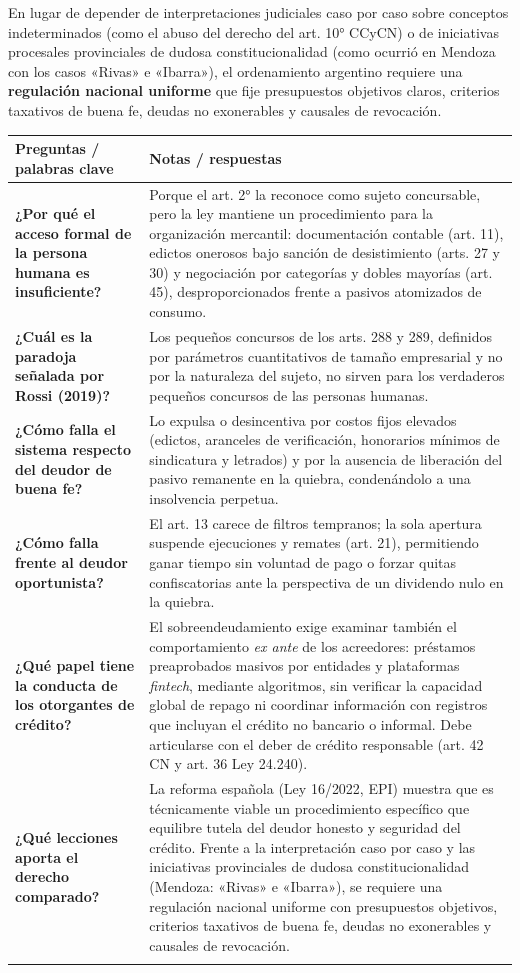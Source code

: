 \documentclass[12pt,oneside]{book}
\makeatletter
\newcommand{\cornellrow}[2]{\textbf{#1} & #2 \\ \addlinespace[0.8em]}
\newenvironment{cornell}[1]{%
    \par\medskip
    \noindent{\large\bfseries Cuadro Cornell --- #1}\par\smallskip
    \begin{longtable}{@{}>{\raggedright\arraybackslash}p{0.25\textwidth}>{\raggedright\arraybackslash}p{0.69\textwidth}@{}}
    \toprule
    \textbf{Preguntas / palabras clave} & \textbf{Notas / respuestas} \\
    \midrule
    \endhead
}{%
    \bottomrule
    \end{longtable}
}
\newcommand{\cornellsummary}[1]{%
    \midrule
    \multicolumn{2}{@{}p{\dimexpr0.94\textwidth+2\tabcolsep\relax}@{}}{\textbf{Resumen:} #1} \\
}
\makeatother
\begin{document}
En lugar de depender de interpretaciones judiciales caso por caso sobre conceptos indeterminados (como el abuso del derecho del art. 10° CCyCN) o de iniciativas procesales provinciales de dudosa constitucionalidad (como ocurrió en Mendoza con los casos «Rivas» e «Ibarra»), el ordenamiento argentino requiere una \textbf{regulación nacional uniforme} que fije presupuestos objetivos claros, criterios taxativos de buena fe, deudas no exonerables y causales de revocación.

\begin{cornell}{Análisis crítico}
\cornellrow{¿Por qué el acceso formal de la persona humana es insuficiente?}{Porque el art. 2° la reconoce como sujeto concursable, pero la ley mantiene un procedimiento para la organización mercantil: documentación contable (art. 11), edictos onerosos bajo sanción de desistimiento (arts. 27 y 30) y negociación por categorías y dobles mayorías (art. 45), desproporcionados frente a pasivos atomizados de consumo.}
\cornellrow{¿Cuál es la paradoja señalada por Rossi (2019)?}{Los pequeños concursos de los arts. 288 y 289, definidos por parámetros cuantitativos de tamaño empresarial y no por la naturaleza del sujeto, no sirven para los verdaderos pequeños concursos de las personas humanas.}
\cornellrow{¿Cómo falla el sistema respecto del deudor de buena fe?}{Lo expulsa o desincentiva por costos fijos elevados (edictos, aranceles de verificación, honorarios mínimos de sindicatura y letrados) y por la ausencia de liberación del pasivo remanente en la quiebra, condenándolo a una insolvencia perpetua.}
\cornellrow{¿Cómo falla frente al deudor oportunista?}{El art. 13 carece de filtros tempranos; la sola apertura suspende ejecuciones y remates (art. 21), permitiendo ganar tiempo sin voluntad de pago o forzar quitas confiscatorias ante la perspectiva de un dividendo nulo en la quiebra.}
\cornellrow{¿Qué papel tiene la conducta de los otorgantes de crédito?}{El sobreendeudamiento exige examinar también el comportamiento \textit{ex ante} de los acreedores: préstamos preaprobados masivos por entidades y plataformas \textit{fintech}, mediante algoritmos, sin verificar la capacidad global de repago ni coordinar información con registros que incluyan el crédito no bancario o informal. Debe articularse con el deber de crédito responsable (art. 42 CN y art. 36 Ley 24.240).}
\cornellrow{¿Qué lecciones aporta el derecho comparado?}{La reforma española (Ley 16/2022, EPI) muestra que es técnicamente viable un procedimiento específico que equilibre tutela del deudor honesto y seguridad del crédito. Frente a la interpretación caso por caso y las iniciativas provinciales de dudosa constitucionalidad (Mendoza: «Rivas» e «Ibarra»), se requiere una regulación nacional uniforme con presupuestos objetivos, criterios taxativos de buena fe, deudas no exonerables y causales de revocación.}
\cornellsummary{El régimen vigente falla en dos direcciones: excluye materialmente al deudor honesto y carece de filtros tempranos frente al oportunista. A ello se suma la ausencia de prevención mediante crédito responsable. La experiencia comparada y los problemas de la vía provincial justifican una regulación nacional uniforme.}
\end{cornell}
\end{document}
